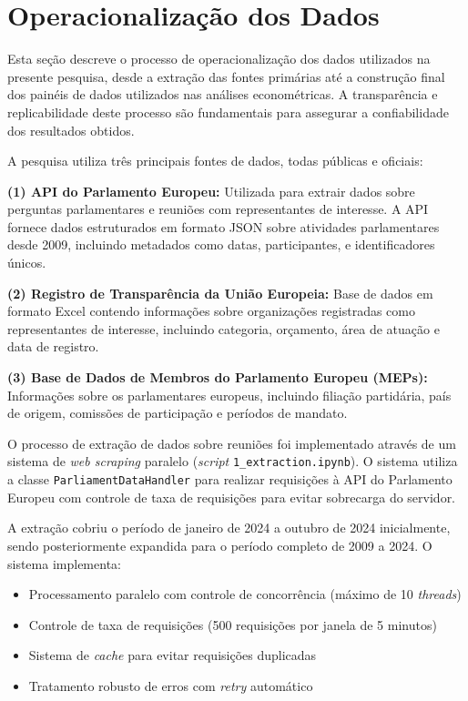 \section{Operacionalização dos Dados}
\label{sec:operacionalizacao}

Esta seção descreve o processo de operacionalização dos dados utilizados na presente pesquisa, desde a extração das fontes primárias até a construção final dos painéis de dados utilizados nas análises econométricas. A transparência e replicabilidade deste processo são fundamentais para assegurar a confiabilidade dos resultados obtidos.

A pesquisa utiliza três principais fontes de dados, todas públicas e oficiais:

\textbf{(1) API do Parlamento Europeu:} Utilizada para extrair dados sobre perguntas parlamentares e reuniões com representantes de interesse. A API fornece dados estruturados em formato JSON sobre atividades parlamentares desde 2009, incluindo metadados como datas, participantes, e identificadores únicos.

\textbf{(2) Registro de Transparência da União Europeia:} Base de dados em formato Excel contendo informações sobre organizações registradas como representantes de interesse, incluindo categoria, orçamento, área de atuação e data de registro.

\textbf{(3) Base de Dados de Membros do Parlamento Europeu (MEPs):} Informações sobre os parlamentares europeus, incluindo filiação partidária, país de origem, comissões de participação e períodos de mandato.


O processo de extração de dados sobre reuniões foi implementado através de um sistema de \textit{web scraping} paralelo (\textit{script} \texttt{1\_extraction.ipynb}). O sistema utiliza a classe \texttt{ParliamentDataHandler} para realizar requisições à API do Parlamento Europeu com controle de taxa de requisições para evitar sobrecarga do servidor.

A extração cobriu o período de janeiro de 2024 a outubro de 2024 inicialmente, sendo posteriormente expandida para o período completo de 2009 a 2024. O sistema implementa:
\begin{itemize}
    \item Processamento paralelo com controle de concorrência (máximo de 10 \textit{threads})
    \item Controle de taxa de requisições (500 requisições por janela de 5 minutos)
    \item Sistema de \textit{cache} para evitar requisições duplicadas
    \item Tratamento robusto de erros com \textit{retry} automático
\end{itemize}

